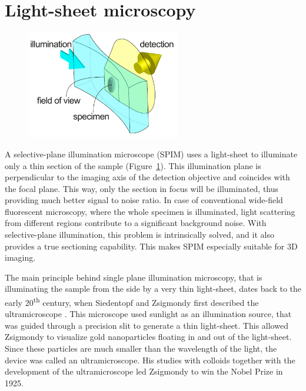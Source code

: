 

\section{Light-sheet microscopy}
  \label{sec:light-sheet}
  \begin{figure}[b!]
    \centering
    \includegraphics[width=0.6\textwidth]{spim_concept}
    \label{fig:spim_concept}
  \end{figure}

  A selective-plane illumination microscope (SPIM) uses a light-sheet to illuminate only a thin section of the sample (Figure~\ref{fig:spim_concept}). This illumination plane is perpendicular to the imaging axis of the detection objective and coincides with the focal plane. This way, only the section in focus will be illuminated, thus providing much better signal to noise ratio. In case of conventional wide-field fluorescent microscopy, where the whole specimen is illuminated, light scattering from different regions contribute to a significant background noise. With selective-plane illumination, this problem is intrinsically solved, and it also provides a true sectioning capability. This makes SPIM especially suitable for 3D imaging.

  

  The main principle behind single plane illumination microscopy, that is illuminating the sample from the side by a very thin light-sheet, dates back to the early 20\textsuperscript{th} century, when Siedentopf and Zsigmondy first described the ultramicroscope \cite{siedentopf_uber_1902}. This microscope used sunlight as an illumination source, that was guided through a precision slit to generate a thin light-sheet. This allowed Zsigmondy to visualize gold nanoparticles floating in and out of the light-sheet. Since these particles are much smaller than the wavelength of the light, the device was called an ultramicroscope. His studies with colloids together with the development of the ultramicroscope led Zsigmondy to win the Nobel Prize in 1925.

